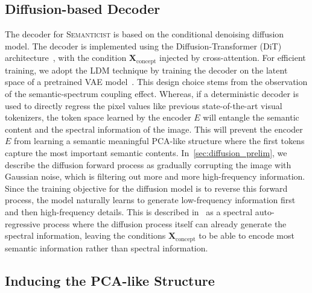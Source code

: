 \documentclass[10pt,twocolumn,letterpaper]{article}
\DeclareRobustCommand{\modelname}{\textsc{Semanticist}\xspace}
\begin{document}
\subsection{Diffusion-based Decoder}
The decoder for \modelname is based on the conditional denoising diffusion model.
The decoder is implemented using the Diffusion-Transformer (DiT) architecture~\cite{dit}, with the condition $\bm{X}_{\text{concept}}$ injected by cross-attention.
For efficient training, we adopt the LDM technique by training the decoder on the latent space of a pretrained VAE model~\cite{LDM}.
This design choice stems from the observation of the semantic-spectrum coupling effect. Whereas, if a deterministic decoder is used to directly regress the pixel values like previous state-of-the-art visual tokenizers, the token space learned by the encoder $E$ will entangle the semantic content and the spectral information of the image.
This will prevent the encoder $E$ from learning a semantic meaningful PCA-like structure where the first tokens capture the most important semantic contents.
In~\cref{sec:diffusion_prelim}, we describe the diffusion forward process as gradually corrupting the image with Gaussian noise, which is filtering out more and more high-frequency information.
Since the training objective for the diffusion model is to reverse this forward process, the model naturally learns to generate low-frequency information first and then high-frequency details.
This is described in~\cite{diffae,rissanen2022generative} as a spectral auto-regressive process where the diffusion process itself can already generate the spectral information, leaving the conditions $\bm{X}_{\text{concept}}$ to be able to encode most semantic information rather than spectral information.







\subsection{Inducing the PCA-like Structure}
\label{sec:prove_pca}
\end{document}

